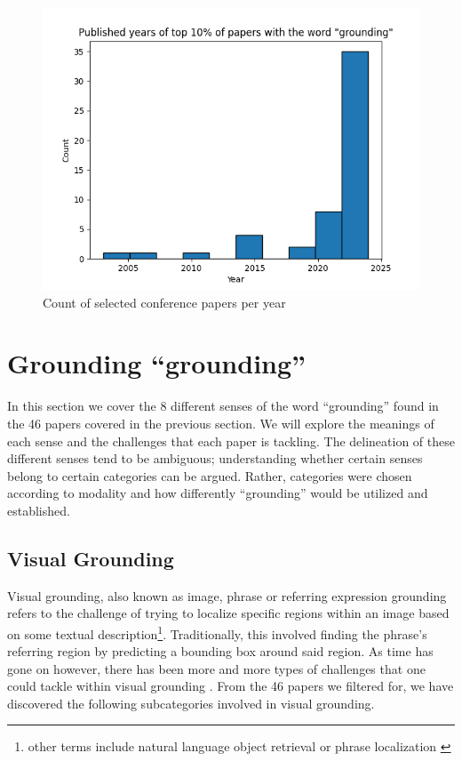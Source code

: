 \documentclass[11pt]{article}
\begin{document}
\begin{figure}[h]
  \includegraphics[width=\columnwidth]{figs/years_histogram.png}
  \caption{Count of selected conference papers per year}
  \label{fig:conference_years}
\end{figure}

\section{Grounding ``grounding''}
In this section we cover the 8 different senses of the word ``grounding'' found in the 46 papers covered in the previous section. We will explore the meanings of each sense and the challenges that each paper is tackling. The delineation of these different senses tend to be ambiguous; understanding whether certain senses belong to certain categories can be argued. Rather, categories were chosen according to modality and how differently ``grounding'' would be utilized and established.

\subsection{Visual Grounding}
\label{sec:visual}
Visual grounding, also known as image, phrase or referring expression grounding \cite{xiao2024visualgroundingsurvey, li-etal-2024-groundinggpt,ma2020learninggenerategroundedvisual,Islam_Gladstone_Iqbal_2023_PATRON, jiang-etal-2019-tiger,lu-etal-2022-extending, dou-peng-2021-improving,surikuchi-etal-2023-groovist} refers to the challenge of trying to localize specific regions within an image based on some textual description\footnote{other terms include natural language object retrieval or phrase localization \cite{gigapixel}}. Traditionally, this involved finding the phrase's referring region by predicting a bounding box around said region. As time has gone on however, there has been more and more types of challenges that one could tackle within visual grounding \cite{xiao2024visualgroundingsurvey}. From the 46 papers we filtered for, we have discovered the following subcategories involved in visual grounding.
\end{document}
